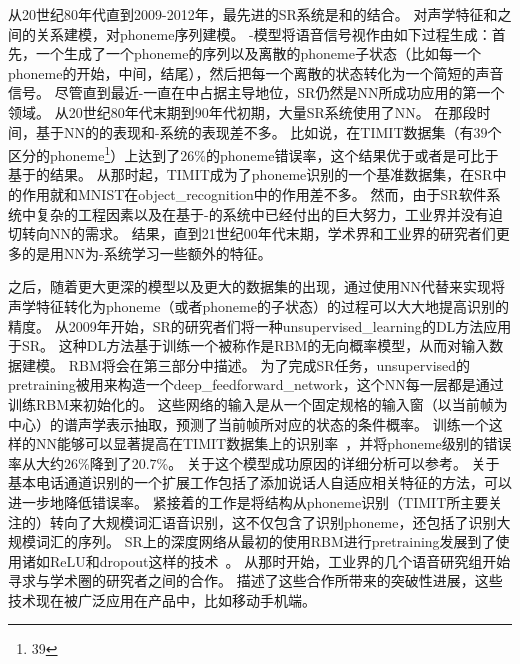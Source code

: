 从20世纪80年代直到2009-2012年，最先进的\gls{SR}系统是和的结合。
对声学特征和之间的关系建模\citep{Bahl87}，对\gls{phoneme}序列建模。
-模型将语音信号视作由如下过程生成：首先，一个生成了一个\gls{phoneme}的序列以及离散的\gls{phoneme}子状态（比如每一个\gls{phoneme}的开始，中间，结尾），然后把每一个离散的状态转化为一个简短的声音信号。
尽管直到最近-一直在中占据主导地位，\gls{SR}仍然是\gls{NN}所成功应用的第一个领域。
从20世纪80年代末期到90年代初期，大量\gls{SR}系统使用了\gls{NN}\citep{Bourlard-cspla89,Waibel89b,Robinson+Fallside91,Bengio91z,Bengio92c,Konig96}。
在那段时间，基于\gls{NN}的的表现和-系统的表现差不多。
比如说，\citet{Robinson+Fallside91}在TIMIT数据集\citep{garofolo1993darpa}（有$39$个区分的\gls{phoneme}\footnote{39}）上达到了$26$\%的\gls{phoneme}错误率，这个结果优于或者是可比于基于的结果。
从那时起，TIMIT成为了\gls{phoneme}识别的一个基准数据集，在\gls{SR}中的作用就和MNIST在\gls{object_recognition}中的作用差不多。
然而，由于\gls{SR}软件系统中复杂的工程因素以及在基于-的系统中已经付出的巨大努力，工业界并没有迫切转向\gls{NN}的需求。
结果，直到21世纪00年代末期，学术界和工业界的研究者们更多的是用\gls{NN}为-系统学习一些额外的特征。


之后，随着更大更深的模型以及更大的数据集的出现，通过使用\gls{NN}代替来实现将声学特征转化为\gls{phoneme}（或者\gls{phoneme}的子状态）的过程可以大大地提高识别的精度。
从2009年开始，\gls{SR}的研究者们将一种\gls{unsupervised_learning}的\gls{DL}方法应用于\gls{SR}。
这种\gls{DL}方法基于训练一个被称作是\gls{RBM}的无向概率模型，从而对输入数据建模。
 \gls{RBM}将会在第三部分中描述。
 为了完成\gls{SR}任务，\gls{unsupervised}的\gls{pretraining}被用来构造一个\gls{deep_feedforward_network}，这个\gls{NN}每一层都是通过训练\gls{RBM}来初始化的。
 这些网络的输入是从一个固定规格的输入窗（以当前帧为中心）的谱声学表示抽取，预测了当前帧所对应的状态的条件概率。
 训练一个这样的\gls{NN}能够可以显著提高在TIMIT数据集上的识别率~\citep{mohamed2009deep,Mohamed+Dahl+Hinton-2012}，并将\gls{phoneme}级别的错误率从大约$26$\%降到了$20.7$\%。
关于这个模型成功原因的详细分析可以参考\citet{mohamed2012understanding}。
关于基本电话通道识别的一个扩展工作包括了添加说话人自适应相关特征\citep{mohamed2011deep}的方法，可以进一步地降低错误率。
紧接着的工作是将结构从\gls{phoneme}识别（TIMIT所主要关注的）转向了大规模词汇语音识别\citep{Dahl2012}，这不仅包含了识别\gls{phoneme}，还包括了识别大规模词汇的序列。
\gls{SR}上的深度网络从最初的使用\gls{RBM}进行\gls{pretraining}发展到了使用诸如\gls{ReLU}和\gls{dropout}这样的技术~\citep{Zeiler+al-ICASSP-2013,Dahl-et-al-ICASSP2013}。
从那时开始，工业界的几个语音研究组开始寻求与学术圈的研究者之间的合作。
\citet{Hinton-et-al-2012}描述了这些合作所带来的突破性进展，这些技术现在被广泛应用在产品中，比如移动手机端。

